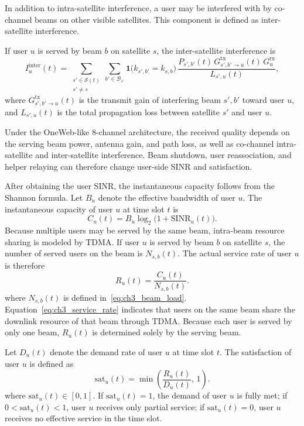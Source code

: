 In addition to intra-satellite interference, a user may be interfered with by co-channel beams on other visible satellites. This component is defined as inter-satellite interference.

If user $u$ is served by beam $b$ on satellite $s$, the inter-satellite interference is
\begin{equation*}
I_u^{\mathrm{inter}}(t)=\sum_{\substack{s'\in\mathcal{S}(t)\\ s'\neq s}}
\sum_{b'\in\mathcal{B}_{s'}}
\mathbf{1}\!\bigl(k_{s',b'}=k_{s,b}\bigr)\,
\frac{P_{s',b'}(t)\,G^{\mathrm{tx}}_{s',b'\to u}(t)\,G^{\mathrm{rx}}_u}{L_{s',u}(t)},
\end{equation*}
where $G^{\mathrm{tx}}_{s',b'\to u}(t)$ is the transmit gain of interfering beam $s',b'$ toward user $u$, and $L_{s',u}(t)$ is the total propagation loss between satellite $s'$ and user $u$.

Under the OneWeb-like 8-channel architecture, the received quality depends on the serving beam power, antenna gain, and path loss, as well as co-channel intra-satellite and inter-satellite interference. Beam shutdown, user reassociation, and helper relaying can therefore change user-side SINR and satisfaction.

After obtaining the user SINR, the instantaneous capacity follows from the Shannon formula. Let $B_u$ denote the effective bandwidth of user $u$. The instantaneous capacity of user $u$ at time slot $t$ is
\begin{equation*}
C_u(t)=B_u\log_2\!\bigl(1+\mathrm{SINR}_u(t)\bigr).
\end{equation*}
Because multiple users may be served by the same beam, intra-beam resource sharing is modeled by TDMA. If user $u$ is served by beam $b$ on satellite $s$, the number of served users on the beam is $N_{s,b}(t)$. The actual service rate of user $u$ is therefore
\begin{equation}
R_u(t)=\frac{C_u(t)}{N_{s,b}(t)}.
\label{eq:ch3_service_rate}
\end{equation}
where $N_{s,b}(t)$ is defined in~\eqref{eq:ch3_beam_load}. Equation~\eqref{eq:ch3_service_rate} indicates that users on the same beam share the downlink resource of that beam through TDMA. Because each user is served by only one beam, $R_u(t)$ is determined solely by the serving beam.

Let $D_u(t)$ denote the demand rate of user $u$ at time slot $t$. The satisfaction of user $u$ is defined as
\begin{equation}
\mathrm{sat}_u(t)=\min\!\left(\frac{R_u(t)}{D_u(t)},\,1\right).
\label{eq:ch3_satisfaction}
\end{equation}
where $\mathrm{sat}_u(t)\in[0,1]$. If $\mathrm{sat}_u(t)=1$, the demand of user $u$ is fully met; if $0<\mathrm{sat}_u(t)<1$, user $u$ receives only partial service; if $\mathrm{sat}_u(t)=0$, user $u$ receives no effective service in the time slot.

